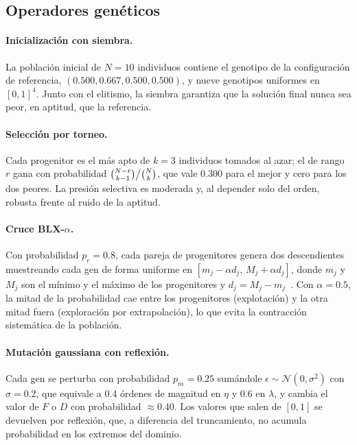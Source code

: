 \subsection{Operadores genéticos}\label{subsec:operadores}

\paragraph{Inicialización con siembra.} La población inicial de $N=10$ individuos contiene el genotipo de la configuración de referencia, $(0.500, 0.667, 0.500, 0.500)$, y nueve genotipos uniformes en $[0,1]^4$. Junto con el elitismo, la siembra garantiza que la solución final nunca sea peor, en aptitud, que la referencia.

\paragraph{Selección por torneo.} Cada progenitor es el más apto de $k=3$ individuos tomados al azar; el de rango $r$ gana con probabilidad $\tbinom{N-r}{k-1}\big/\tbinom{N}{k}$, que vale 0.300 para el mejor y cero para los dos peores. La presión selectiva es moderada y, al depender solo del orden, robusta frente al ruido de la aptitud.

\paragraph{Cruce BLX-$\alpha$.} Con probabilidad $p_c=0.8$, cada pareja de progenitores genera dos descendientes muestreando cada gen de forma uniforme en $[m_j-\alpha d_j,\, M_j+\alpha d_j]$, donde $m_j$ y $M_j$ son el mínimo y el máximo de los progenitores y $d_j=M_j-m_j$~\cite{eshelman1993realcoded}. Con $\alpha=0.5$, la mitad de la probabilidad cae entre los progenitores (explotación) y la otra mitad fuera (exploración por extrapolación), lo que evita la contracción sistemática de la población.

\paragraph{Mutación gaussiana con reflexión.} Cada gen se perturba con probabilidad $p_m=0.25$ sumándole $\epsilon\sim\mathcal{N}(0,\sigma^2)$ con $\sigma=0.2$, que equivale a 0.4 órdenes de magnitud en $\eta$ y 0.6 en $\lambda$, y cambia el valor de $F$ o $D$ con probabilidad $\approx0.40$. Los valores que salen de $[0,1]$ se devuelven por reflexión, que, a diferencia del truncamiento, no acumula probabilidad en los extremos del dominio.

